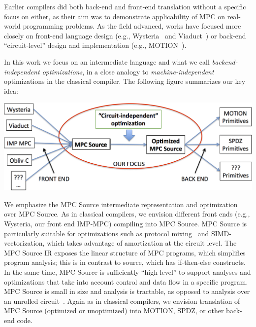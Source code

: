 \documentclass[sigconf, screen, natbib=false, dvipsnames, table]{acmart}
\theoremstyle{definition}
\begin{document}
Earlier compilers did both back-end and front-end translation without a specific focus on either, as their aim was to demonstrate applicability of MPC on real-world
programming problems. As the field advanced, works have focused more closely on front-end language design (e.g., Wysteria~\cite{SP:RasHamHic14} and Viaduct~\cite{Acay:2021}) 
or back-end ``circuit-level'' design and implementation (e.g., MOTION~\cite{Braun:2022}). 

In this work we focus on an intermediate language and what we call \emph{backend-independent optimizations}, in a close analogy to \emph{machine-independent} optimizations
in the classical compiler. The following figure summarizes our key idea: 

{\begin{center}
\includegraphics[width=0.8\linewidth]{figs_paper_SIMD/focus.png}
\end{center}
}

We emphasize the MPC Source intermediate representation and optimization over MPC Source. As in classical compilers, we envision different front ends (e.g., Wysteria,
our front end IMP-MPC) compiling into MPC Source. MPC Source is particularly suitable for optimizations such as protocol mixing~\cite{Ishaq:2019, Fang:2022} and SIMD-vectorization, 
which takes advantage of amortization at the circuit level. The MPC Source IR exposes the linear structure of MPC programs, which simplifies program analysis; this is
in contrast to source, which has if-then-else constructs. In the same time, MPC Source is sufficiently ``high-level''  to support analyses and optimizations that take into account 
control and data flow in a specific program. MPC Source is small in size and analysis is tractable, as opposed to analysis over an unrolled circuit~\cite{Ishaq:2019}. Again as
in classical compilers, we envision translation of MPC Source (optimized or unoptimized) into MOTION, SPDZ, or other back-end code.


  
\end{document}
